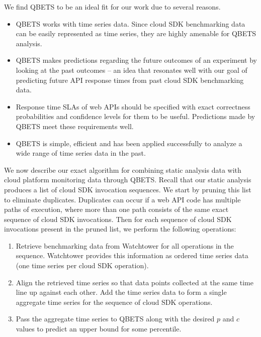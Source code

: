 We find QBETS to be an ideal fit for our work due to several reasons. 
\begin{itemize}
\item QBETS works with time series data. Since
cloud SDK benchmarking data can be easily represented as time series,
they are highly amenable for QBETS analysis. 
\item QBETS makes predictions regarding the
future outcomes of an experiment by looking at the past outcomes -- an idea that resonates well with our
goal of predicting future API response times from past cloud SDK benchmarking data. 
\item Response time
SLAs of web APIs should be specified with exact correctness probabilities and confidence levels for
them to be useful. Predictions made by QBETS meet these requirements well. 
\item QBETS is 
simple, efficient and has been applied successfully to analyze a wide range of time series data in the past.
\end{itemize}

We now describe our exact algorithm for combining static analysis data with cloud platform monitoring 
data through QBETS. Recall that our static analysis produces a list of cloud SDK invocation sequences.
We start by pruning this list to eliminate duplicates. Duplicates can occur if a web API code has
multiple paths of execution, where more than one path consists of the same exact sequence of cloud 
SDK invocations. Then for each sequence of cloud SDK invocations present in the pruned list, we
perform the following operations:

\begin{enumerate}
\item Retrieve benchmarking data from Watchtower for all operations in the sequence. Watchtower provides
this information as ordered time series data (one time series per cloud SDK operation).
\item Align the retrieved time series so that data points collected at the same time line up against each other.
Add the time series data to form a single aggregate time series for the sequence of cloud SDK operations.
\item Pass the aggregate time series to QBETS along with the desired $p$ and $c$ values to predict an
upper bound for some percentile. 
\end{enumerate}

